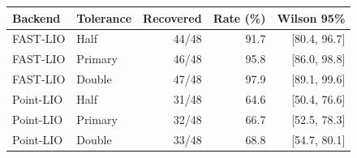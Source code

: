 \begin{tabular}{@{}llrrr@{}}
\toprule
Backend & Tolerance & Recovered & Rate (\%) & Wilson 95\%\\\midrule
FAST-LIO & Half & 44/48 & 91.7 & [80.4, 96.7]\\
FAST-LIO & Primary & 46/48 & 95.8 & [86.0, 98.8]\\
FAST-LIO & Double & 47/48 & 97.9 & [89.1, 99.6]\\
Point-LIO & Half & 31/48 & 64.6 & [50.4, 76.6]\\
Point-LIO & Primary & 32/48 & 66.7 & [52.5, 78.3]\\
Point-LIO & Double & 33/48 & 68.8 & [54.7, 80.1]\\
\bottomrule
\end{tabular}
